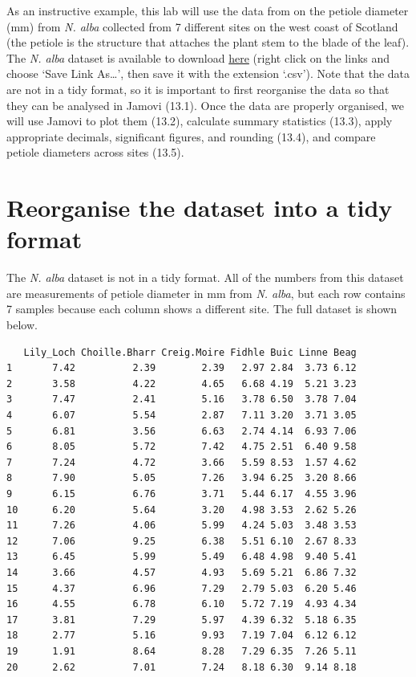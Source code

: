 \documentclass[
]{scrbook}
\begin{document}
As an instructive example, this lab will use the data from \citet{Law2014} on the petiole diameter (mm) from \emph{N. alba} collected from 7 different sites on the west coast of Scotland (the petiole is the structure that attaches the plant stem to the blade of the leaf).
The \emph{N. alba} dataset is available to download \href{https://raw.githubusercontent.com/bradduthie/SCIU4T4/main/data/Nymphaea_alba.csv}{here} (right click on the links and choose `Save Link As\ldots{}', then save it with the extension `.csv').
Note that the data are not in a tidy format, so it is important to first reorganise the data so that they can be analysed in Jamovi (13.1).
Once the data are properly organised, we will use Jamovi to plot them (13.2), calculate summary statistics (13.3), apply appropriate decimals, significant figures, and rounding (13.4), and compare petiole diameters across sites (13.5).

\hypertarget{reorganise-the-dataset-into-a-tidy-format}{%
\section{Reorganise the dataset into a tidy format}\label{reorganise-the-dataset-into-a-tidy-format}}

The \emph{N. alba} dataset is not in a tidy format.
All of the numbers from this dataset are measurements of petiole diameter in mm from \emph{N. alba}, but each row contains 7 samples because each column shows a different site.
The full dataset is shown below.

\begin{verbatim}
   Lily_Loch Choille.Bharr Creig.Moire Fidhle Buic Linne Beag
1       7.42          2.39        2.39   2.97 2.84  3.73 6.12
2       3.58          4.22        4.65   6.68 4.19  5.21 3.23
3       7.47          2.41        5.16   3.78 6.50  3.78 7.04
4       6.07          5.54        2.87   7.11 3.20  3.71 3.05
5       6.81          3.56        6.63   2.74 4.14  6.93 7.06
6       8.05          5.72        7.42   4.75 2.51  6.40 9.58
7       7.24          4.72        3.66   5.59 8.53  1.57 4.62
8       7.90          5.05        7.26   3.94 6.25  3.20 8.66
9       6.15          6.76        3.71   5.44 6.17  4.55 3.96
10      6.20          5.64        3.20   4.98 3.53  2.62 5.26
11      7.26          4.06        5.99   4.24 5.03  3.48 3.53
12      7.06          9.25        6.38   5.51 6.10  2.67 8.33
13      6.45          5.99        5.49   6.48 4.98  9.40 5.41
14      3.66          4.57        4.93   5.69 5.21  6.86 7.32
15      4.37          6.96        7.29   2.79 5.03  6.20 5.46
16      4.55          6.78        6.10   5.72 7.19  4.93 4.34
17      3.81          7.29        5.97   4.39 6.32  5.18 6.35
18      2.77          5.16        9.93   7.19 7.04  6.12 6.12
19      1.91          8.64        8.28   7.29 6.35  7.26 5.11
20      2.62          7.01        7.24   8.18 6.30  9.14 8.18
\end{verbatim}
\end{document}
